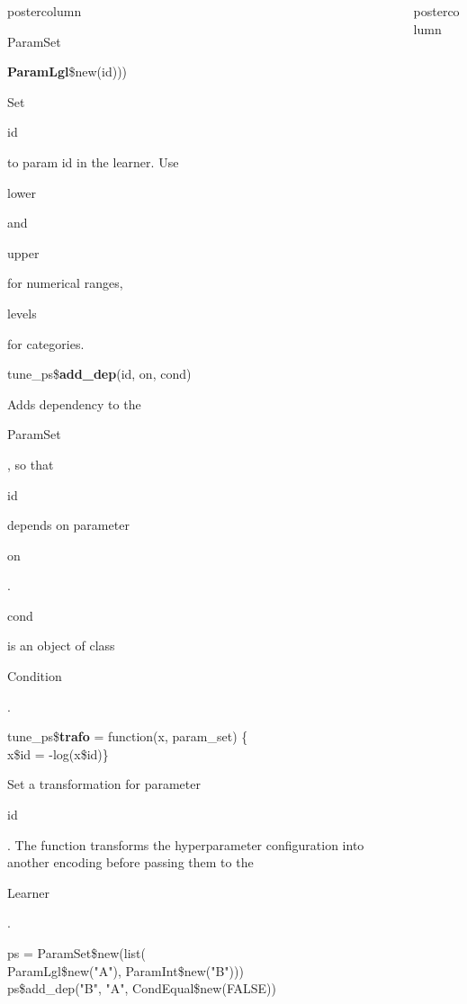 \documentclass{beamer}
\newlength{\columnheight} %
\newcommand{\codeinline}[1]{\begin{codeboxinline}#1\end{codeboxinline}}
\begin{document}
\begin{frame}[fragile]{}
\begin{columns}
\begin{column}{.245\textwidth}
\begin{beamercolorbox}[center]{postercolumn}
\begin{minipage}{.98\textwidth}
{\begin{myblock}{ParamSet}
\begin{codeboxmultiline}[width=21cm]
								\hspace*{1ex}\textbf{ParamLgl}\$new(id)))
							\end{codeboxmultiline}
                            Set \codeinline{id} to param id in the learner. Use \codeinline{lower} and \codeinline{upper} for numerical ranges, \codeinline{levels} for categories. 
							\\
							\begin{codebox}
								tune\_ps\$\textbf{add\_dep}(id, on, cond)
							\end{codebox}
							Adds dependency to the \codeinline{ParamSet}, so that \codeinline{id} depends on parameter \codeinline{on}.
							\codeinline{cond} is an object of class \codeinline{Condition}.
							\\
							\begin{codeboxmultiline}[width=26cm]
								tune\_ps\$\textbf{trafo} = function(x, param\_set) \{ \\
								\hspace*{1ex}x\$id = -log(x\$id)\}
							\end{codeboxmultiline}
							Set a transformation for parameter \codeinline{id}. 
							The function transforms the hyperparameter configuration into another encoding 
							before passing them to the \codeinline{Learner}.
							\\
							\begin{codeboxexample}
								\footnotesize{
									ps = ParamSet\$new(list(\\
									\hspace*{1ex}ParamLgl\$new("A"), ParamInt\$new("B")))
									\vspace{1em}
									\\
									ps\$add\_dep("B", "A", CondEqual\$new(FALSE))
								}
							\end{codeboxexample}
						\end{myblock}
						\vfill}
				\end{minipage}
			\end{beamercolorbox}
		\end{column}
		\begin{column}{.245\textwidth}
			\begin{beamercolorbox}[center]{postercolumn}
				\begin{minipage}{.98\textwidth}
					\parbox[t][\columnheight]{\textwidth}{
}
\end{minipage}
\end{beamercolorbox}
\end{column}
\end{columns}
\end{frame}
\end{document}

